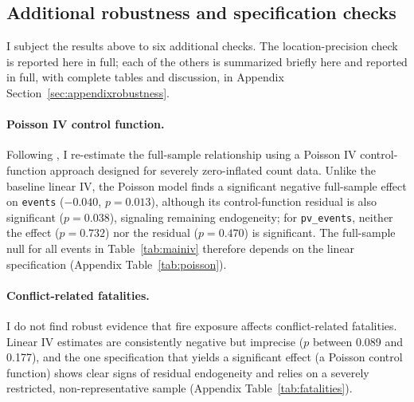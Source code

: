 \documentclass[12pt]{article}
\begin{document}
\subsection{Additional robustness and specification checks}
\label{sec:robustness-summary}

I subject the results above to six additional checks. The location-precision check is reported here in full; each of the others is summarized briefly here and reported in full, with complete tables and discussion, in Appendix Section~\ref{sec:appendixrobustness}.

\paragraph{Poisson IV control function.} Following \citet{lu2023fish}, I re-estimate the full-sample relationship using a Poisson IV control-function approach \citep{terzabasurathouz2008} designed for severely zero-inflated count data. Unlike the baseline linear IV, the Poisson model finds a significant negative full-sample effect on \texttt{events} ($-0.040$, $p=0.013$), although its control-function residual is also significant ($p=0.038$), signaling remaining endogeneity; for \texttt{pv\_events}, neither the effect ($p=0.732$) nor the residual ($p=0.470$) is significant. The full-sample null for all events in Table~\ref{tab:mainiv} therefore depends on the linear specification (Appendix Table~\ref{tab:poisson}).

\paragraph{Conflict-related fatalities.} I do not find robust evidence that fire exposure affects conflict-related fatalities. Linear IV estimates are consistently negative but imprecise ($p$ between 0.089 and 0.177), and the one specification that yields a significant effect (a Poisson control function) shows clear signs of residual endogeneity and relies on a severely restricted, non-representative sample (Appendix Table~\ref{tab:fatalities}).
\end{document}
